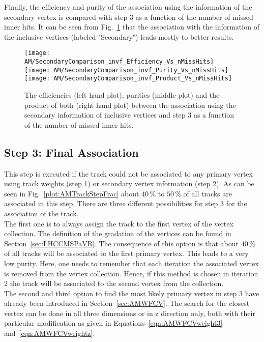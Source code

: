Finally, the efficiency and purity of the association using the information of the secondary vertex is compared with step 3 as a function of the number of missed inner hits. It can be seen from Fig.~\ref{plot:AMWFSVinvfEffAndPurVsFA} that the association with the information of the inclusive vertices (labeled "Secondary") leads mostly to better results.

\begin{figure}[Ht]
    \centering
    \texttt{[image: AM/SecondaryComparison\_invf\_Efficiency\_Vs\_nMissHits]}
    \texttt{[image: AM/SecondaryComparison\_invf\_Purity\_Vs\_nMissHits]}
    \texttt{[image: AM/SecondaryComparison\_invf\_Product\_Vs\_nMissHits]}
    \caption[Efficiencies, purities and their product of the association using inclusive vertices \vs{} step 3 as a function of missed inner hits]{The efficiencies (left hand plot), purities (middle plot) and the product of both (right hand plot) between the association using the secondary information of inclusive vertices and step 3 as a function of the number of missed inner hits.\label{plot:AMWFSVinvfEffAndPurVsFA}}
\end{figure}


\subsection{Step 3: Final Association\label{sec:AMWFFA}}

This step is executed if the track could not be associated to any primary vertex using track weights (step 1) or secondary vertex information (step 2). As can be seen in Fig.~\ref{plot:AMTrackStepFrac} about $40\,\%$ to $50\,\%$ of all tracks are associated in this step. There are three different possibilities for step 3 for the association of the track. \\
The first one is to always assign the track to the first vertex of the vertex collection. The definition of the gradation of the vertices can be found in Section~\ref{sec:LHCCMSPaVR}. The consequence of this option is that about $40\,\%$ of all tracks will be associated to the first primary vertex. This leads to a very low purity. Here, one needs to remember that each iteration the associated vertex is removed from the vertex collection. Hence, if this method is chosen in iteration 2 the track will be associated to the second vertex from the collection. \\
The second and third option to find the most likely primary vertex in step 3 have already been introduced in Section~\ref{sec:AMWFCV}. The search for the closest vertex can be done in all three dimensions or in z direction only, both with their particular modification as given in Equations~\ref{eqn:AMWFCVweight3} and~\ref{eqn:AMWFCVweightz}.

